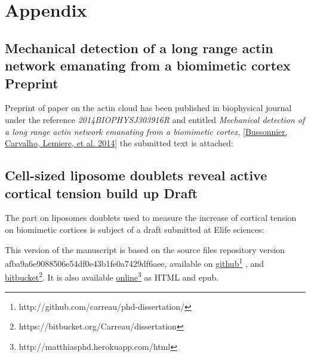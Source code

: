 \documentclass[A4paperpaper,11pt,english]{sphinxmanual}
\begin{document}
\chapter{Appendix}
\label{index-latex:appendix}\label{index-latex::doc}

\section{Mechanical detection of a long range actin network emanating from a biomimetic cortex Preprint}
\label{index-latex:mechanical-detection-of-a-long-range-actin-network-emanating-from-a-biomimetic-cortex-preprint}
Preprint of paper on the actin cloud has been published in biophysical
journal under the reference \emph{2014BIOPHYSJ303916R} and entitled \emph{Mechanical
detection of a long range actin network emanating from a biomimetic cortex},
{\hyperref[index-latex:bussonnier2014]{{[}Bussonnier, Carvalho, Lemiere,  et al.  2014{]}}} the submitted text is attached:



\section{Cell-sized liposome doublets reveal active cortical tension build up Draft}
\label{index-latex:cell-sized-liposome-doublets-reveal-active-cortical-tension-build-up-draft}
The part on liposomes doublets used to measure the increase of cortical tension
on biomimetic cortices is subject of a draft submitted at Elife sciences:



This version of the manuscript is based on the source files repository version
afba9a6e9088506e54df0e43b1fe0a7429df6aee, available on \href{http://github.com/carreau/phd-dissertation/}{github}\footnote{http://github.com/carreau/phd-dissertation/}
, and \href{https://bitbucket.org/Carreau/dissertation}{bitbucket}\footnote{https://bitbucket.org/Carreau/dissertation}. It is also available \href{http://matthiasphd.herokuapp.com/html}{online}\footnote{http://matthiasphd.herokuapp.com/html} as HTML and epub.
\end{document}
